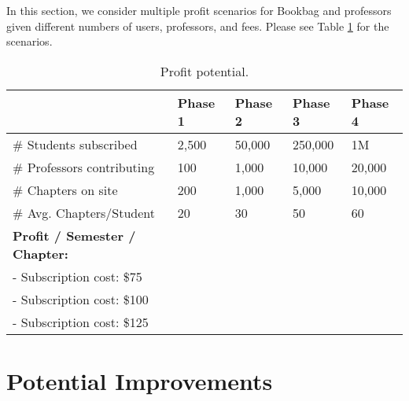 \documentclass[pageno]{jpaper}
\begin{document}
In this section, we consider multiple profit scenarios for Bookbag and professors given different numbers of users, professors, and fees. Please see Table \ref{table:profit} for the scenarios.

\begin{table}[hbt]
  \centering
  \begin{tabular}{|l|l|l|l|l|} \hline
     & 
     \textbf{Phase 1} & 
     \textbf{Phase 2} & 
     \textbf{Phase 3} &
     \textbf{Phase 4}\\\hline
    
    \# Students subscribed &
    2,500 &
    50,000 &
    250,000 &
    1M \\\hline
    
    \# Professors contributing &
    100 & 
    1,000 & 
    10,000 &
    20,000 \\\hline
    
    \# Chapters on site &
    200 & 
    1,000 & 
    5,000 &
    10,000 \\\hline
    
    \# Avg. Chapters/Student &
    20 & 
    30 &
    50 & 
    60 \\\hline
    
   \textbf{Profit / Semester / Chapter:} & & & &\\\hline
   
   \hspace{3mm}- Subscription cost: \$75 & & & &\\\hline
   
   \hspace{3mm}- Subscription cost: \$100 & & & &\\\hline
   
   \hspace{3mm}- Subscription cost: \$125 & & & &\\\hline
    
  \end{tabular}
  \caption{Profit potential.}
  \label{table:profit}
\end{table}

\section{Potential Improvements} \label{final}
\end{document}
